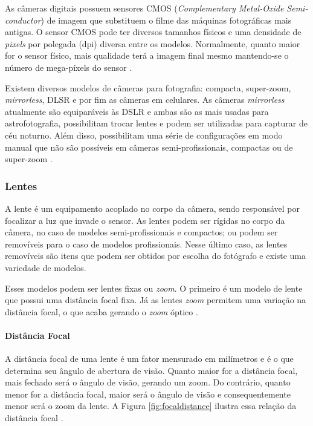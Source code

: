 As câmeras digitais possuem sensores CMOS (\textit{Complementary Metal-Oxide Semi-conductor}) de imagem que substituem o filme das máquinas fotográficas mais antigas. O sensor CMOS pode ter diversos tamanhos físicos e uma densidade de \textit{pixels} por polegada (dpi) diversa entre os modelos. Normalmente, quanto maior for o sensor físico, mais qualidade terá a imagem final mesmo mantendo-se o número de mega-píxels do sensor \cite{man:vanessacameras}.

Existem diversos modelos de câmeras para fotografia: compacta, super-zoom, \textit{mirrorless}, DLSR e por fim as câmeras em celulares. As câmeras \textit{mirrorless} atualmente são equiparáveis às DSLR e ambas são as mais usadas para astrofotografia, possibilitam trocar lentes e podem ser utilizadas para capturar de céu noturno. Além disso, possibilitam uma série de configurações em modo manual que não são possíveis em câmeras semi-profissionais, compactas ou de super-zoom \cite{book:bbcsky}.

\subsubsection{Lentes}
A lente é um equipamento acoplado no corpo da câmera, sendo responsável por focalizar a luz que invade o sensor. As lentes podem ser rígidas no corpo da câmera, no caso de modelos semi-profissionais e compactos; ou podem ser removíveis para o caso de modelos profissionais. Nesse último caso, as lentes removíveis são itens que podem ser obtidos por escolha do fotógrafo e existe uma variedade de modelos.

Esses modelos podem ser lentes fixas ou \textit{zoom}. O primeiro é um modelo de lente que possui uma distância focal fixa. Já as lentes \textit{zoom} permitem uma variação na distância focal, o que acaba gerando o \textit{zoom} óptico \cite{man:claudia7licoes}. 

\paragraph{Distância Focal}

A distância focal de uma lente é um fator mensurado em milímetros e é o  que determina seu ângulo de abertura de visão. Quanto maior for a distância focal, mais fechado será o ângulo de visão, gerando um zoom. Do contrário, quanto menor for a distância focal, maior será o ângulo de visão e consequentemente menor será o zoom da lente. A Figura \ref{fig:focaldistance} ilustra essa relação da distância focal \cite{man:claudia7licoes}.

